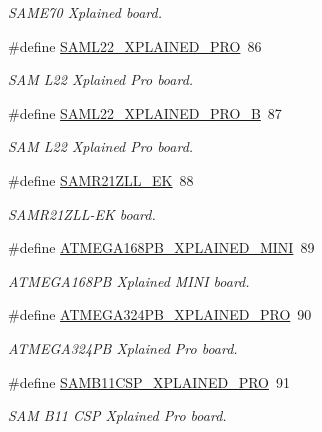 \begin{DoxyCompactItemize}
\begin{DoxyCompactList}\small\item\em S\+A\+M\+E70 Xplained board. \end{DoxyCompactList}\item 
\#define \mbox{\hyperlink{group__group__common__boards_ga51f12acb550a36f2f364f7055c628e5c}{S\+A\+M\+L22\+\_\+\+X\+P\+L\+A\+I\+N\+E\+D\+\_\+\+P\+RO}}~86
\begin{DoxyCompactList}\small\item\em S\+AM L22 Xplained Pro board. \end{DoxyCompactList}\item 
\#define \mbox{\hyperlink{group__group__common__boards_gadab6752a642303598dd7f8fa7012e934}{S\+A\+M\+L22\+\_\+\+X\+P\+L\+A\+I\+N\+E\+D\+\_\+\+P\+R\+O\+\_\+B}}~87
\begin{DoxyCompactList}\small\item\em S\+AM L22 Xplained Pro board. \end{DoxyCompactList}\item 
\#define \mbox{\hyperlink{group__group__common__boards_ga587e990d5ab16e7a540cc9113f78db3b}{S\+A\+M\+R21\+Z\+L\+L\+\_\+\+EK}}~88
\begin{DoxyCompactList}\small\item\em S\+A\+M\+R21\+Z\+L\+L-\/\+EK board. \end{DoxyCompactList}\item 
\#define \mbox{\hyperlink{group__group__common__boards_ga4648060c3a8ed08e6a227f2b1fe3bd80}{A\+T\+M\+E\+G\+A168\+P\+B\+\_\+\+X\+P\+L\+A\+I\+N\+E\+D\+\_\+\+M\+I\+NI}}~89
\begin{DoxyCompactList}\small\item\em A\+T\+M\+E\+G\+A168\+PB Xplained M\+I\+NI board. \end{DoxyCompactList}\item 
\#define \mbox{\hyperlink{group__group__common__boards_ga2269729f56fe6fbac557d1104f85ed9c}{A\+T\+M\+E\+G\+A324\+P\+B\+\_\+\+X\+P\+L\+A\+I\+N\+E\+D\+\_\+\+P\+RO}}~90
\begin{DoxyCompactList}\small\item\em A\+T\+M\+E\+G\+A324\+PB Xplained Pro board. \end{DoxyCompactList}\item 
\#define \mbox{\hyperlink{group__group__common__boards_ga5d5ed3a0591e9ce0f5752f2258b6adea}{S\+A\+M\+B11\+C\+S\+P\+\_\+\+X\+P\+L\+A\+I\+N\+E\+D\+\_\+\+P\+RO}}~91
\begin{DoxyCompactList}\small\item\em S\+AM B11 C\+SP Xplained Pro board. \end{DoxyCompactList}\item 

\end{DoxyCompactItemize}
